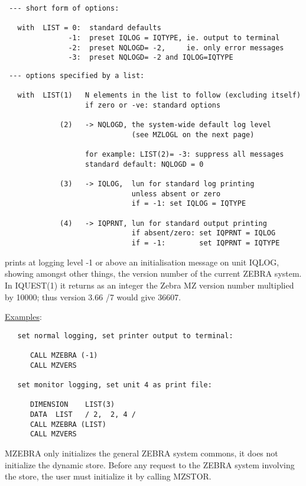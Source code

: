 \begin{verbatim}
 --- short form of options:

   with  LIST = 0:  standard defaults
               -1:  preset IQLOG = IQTYPE, ie. output to terminal
               -2:  preset NQLOGD= -2,     ie. only error messages
               -3:  preset NQLOGD= -2 and IQLOG=IQTYPE

\end{verbatim}

\begin{verbatim}
 --- options specified by a list:

   with  LIST(1)   N elements in the list to follow (excluding itself)
                   if zero or -ve: standard options

             (2)   -> NQLOGD, the system-wide default log level
                              (see MZLOGL on the next page)

                   for example: LIST(2)= -3: suppress all messages
                   standard default: NQLOGD = 0

             (3)   -> IQLOG,  lun for standard log printing
                              unless absent or zero
                              if = -1: set IQLOG = IQTYPE

             (4)   -> IQPRNT, lun for standard output printing
                              if absent/zero: set IQPRNT = IQLOG
                              if = -1:        set IQPRNT = IQTYPE
\end{verbatim} 
 prints at logging level -1 or above an initialisation message
on unit IQLOG, showing amongst other things,
the version number of the current ZEBRA system.
In IQUEST(1) it returns as an integer
the Zebra MZ version number multiplied by 10000;
thus version 3.66 /7 would give 36607.

\ul{Examples}:
\begin{verbatim}
   set normal logging, set printer output to terminal:

      CALL MZEBRA (-1)
      CALL MZVERS

   set monitor logging, set unit 4 as print file:

      DIMENSION    LIST(3)
      DATA  LIST   / 2,  2, 4 /
      CALL MZEBRA (LIST)
      CALL MZVERS
\end{verbatim} 

MZEBRA only initializes the general ZEBRA system commons,
it does not initialize the dynamic store.
Before any request to the ZEBRA system involving the store,
the user must initialize it by calling MZSTOR.

